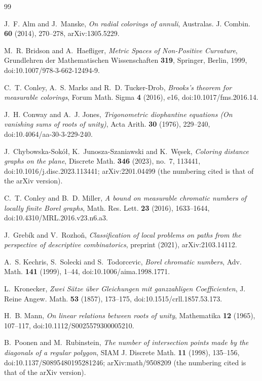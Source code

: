 \documentclass[11pt]{amsart}
\theoremstyle{remark}
\numberwithin{equation}{section}
\begin{document}
\begin{thebibliography}{99}

J.~F. Alm and J.~Manske, \emph{On radial colorings of annuli},
Australas. J. Combin. \textbf{60} (2014), 270--278, arXiv:1305.5229.

M.~R. Bridson and A.~Haefliger, \emph{Metric Spaces of Non-Positive
Curvature}, Grundlehren der Mathematischen Wissenschaften \textbf{319},
Springer, Berlin, 1999, doi:10.1007/978-3-662-12494-9.

C.~T. Conley, A.~S. Marks and R.~D. Tucker-Drob, \emph{Brooks's theorem
for measurable colorings}, Forum Math. Sigma \textbf{4} (2016), e16,
doi:10.1017/fms.2016.14.

J.~H. Conway and A.~J. Jones, \emph{Trigonometric diophantine equations
(On vanishing sums of roots of unity)}, Acta Arith. \textbf{30} (1976),
229--240, doi:10.4064/aa-30-3-229-240.

J.~Chybowska-Sok\'o\l, K.~Junosza-Szaniawski and K.~W\k{e}sek,
\emph{Coloring distance graphs on the plane}, Discrete Math.
\textbf{346} (2023), no.~7, 113441, doi:10.1016/j.disc.2023.113441;
arXiv:2201.04499 (the numbering cited is that of the arXiv version).

C.~T. Conley and B.~D. Miller, \emph{A bound on measurable chromatic
numbers of locally finite Borel graphs}, Math. Res. Lett. \textbf{23}
(2016), 1633--1644, doi:10.4310/MRL.2016.v23.n6.a3.

J.~Greb\'ik and V.~Rozho\v{n}, \emph{Classification of local problems on
paths from the perspective of descriptive combinatorics}, preprint (2021),
arXiv:2103.14112.

A.~S. Kechris, S.~Solecki and S.~Todorcevic, \emph{Borel chromatic
numbers}, Adv. Math. \textbf{141} (1999), 1--44,
doi:10.1006/aima.1998.1771.

L.~Kronecker, \emph{Zwei S\"atze \"uber Gleichungen mit ganzzahligen
Coefficienten}, J. Reine Angew. Math. \textbf{53} (1857), 173--175,
doi:10.1515/crll.1857.53.173.

H.~B. Mann, \emph{On linear relations between roots of unity},
Mathematika \textbf{12} (1965), 107--117, doi:10.1112/S0025579300005210.

B.~Poonen and M.~Rubinstein, \emph{The number of intersection points
made by the diagonals of a regular polygon}, SIAM J. Discrete Math.
\textbf{11} (1998), 135--156, doi:10.1137/S0895480195281246;
arXiv:math/9508209 (the numbering cited is that of the arXiv version).


\end{thebibliography}
\end{document}
